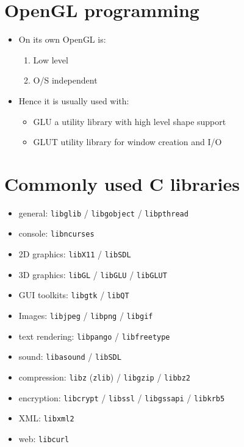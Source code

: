 \documentclass{article}
\begin{document}
\section{OpenGL programming}
\begin{itemize}
\item On its own OpenGL is:
\begin{enumerate}
\item Low level
\item O/S independent
\end{enumerate}
\item Hence it is usually used with:
\begin{itemize}
\item GLU a utility library with high level shape support
\item GLUT utility library for window creation and I/O
\end{itemize}
\end{itemize}



\section{Commonly used C libraries}
\begin{itemize}
\item general: \verb!libglib! / \verb!libgobject! / \verb!libpthread!
\item console: \verb!libncurses!
\item 2D graphics: \verb!libX11! / \verb!libSDL!
\item 3D graphics: \verb!libGL! / \verb!libGLU! / \verb!libGLUT!
\item GUI toolkits: \verb!libgtk! / \verb!libQT!
\item Images: \verb!libjpeg! / \verb!libpng! / \verb!libgif!
\item text rendering: \verb!libpango! / \verb!libfreetype!
\item sound: \verb!libasound! / \verb!libSDL!
\item compression: \verb!libz! (\verb!zlib!) / \verb!libgzip! / \verb!libbz2!
\item encryption: \verb!libcrypt! / \verb!libssl! / \verb!libgssapi! / \verb!libkrb5!
\item XML: \verb!libxml2!
\item web: \verb!libcurl!
\end{itemize}
\end{document}
